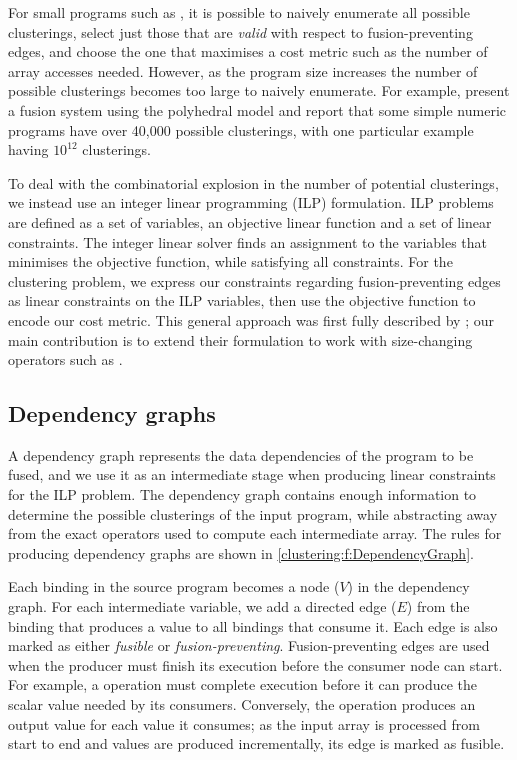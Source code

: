 For small programs such as \Hs@normalizeInc@, it is possible to naively enumerate all possible clusterings, select just those that are \emph{valid} with respect to fusion-preventing edges, and choose the one that maximises a cost metric such as the number of array accesses needed.
However, as the program size increases the number of possible clusterings becomes too large to naively enumerate.
For example, \citet{pouchet2010combined,pouchet2011polyhedral} present a fusion system using the polyhedral model and report that some simple numeric programs have over 40,000 possible clusterings, with one particular example having $10^{12}$ clusterings.

To deal with the combinatorial explosion in the number of potential clusterings, we instead use an integer linear programming (ILP) formulation.
ILP problems are defined as a set of variables, an objective linear function and a set of linear constraints.
The integer linear solver finds an assignment to the variables that minimises the objective function, while satisfying all constraints.
For the clustering problem, we express our constraints regarding fusion-preventing edges as linear constraints on the ILP variables, then use the objective function to encode our cost metric.
This general approach was first fully described by \citet{megiddo1998optimal}; our main contribution is to extend their formulation to work with size-changing operators such as \Hs@filter@. 


\subsection{Dependency graphs}
A dependency graph represents the data dependencies of the program to be fused, and we use it as an intermediate stage when producing linear constraints for the ILP problem.
The dependency graph contains enough information to determine the possible clusterings of the input program, while abstracting away from the exact operators used to compute each intermediate array.
The rules for producing dependency graphs are shown in \cref{clustering:f:DependencyGraph}.



Each binding in the source program becomes a node ($V$) in the dependency graph.
For each intermediate variable, we add a directed edge ($E$) from the binding that produces a value to all bindings that consume it.
Each edge is also marked as either \emph{fusible} or \emph{fusion-preventing}.
Fusion-preventing edges are used when the producer must finish its execution before the consumer node can start.
For example, a \Hs@fold@ operation must complete execution before it can produce the scalar value needed by its consumers.
Conversely, the \Hs@map@ operation produces an output value for each value it consumes; as the input array is processed from start to end and values are produced incrementally, its edge is marked as fusible. 


